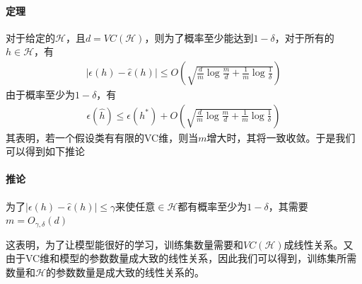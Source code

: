 \paragraph{定理}对于给定的$\mathcal{H}$，且$d=VC(\mathcal{H})$，则为了概率至少能达到$1-\delta$，对于所有的$h\in\mathcal{H}$，有
\begin{eqnarray}
|\epsilon(h)-\hat{\epsilon}(h)|\leq O\left( \sqrt{\frac{d}{m}\log\frac{m}{d}+\frac{1}{m}\log\frac{1}{\delta}}   \right)
\end{eqnarray}
由于概率至少为$1-\delta$，有
\begin{eqnarray}
\epsilon(\hat{h})\leq \epsilon(h^*)+O\left( \sqrt{\frac{d}{m}\log\frac{m}{d}+\frac{1}{m}\log\frac{1}{\delta}}   \right)
\end{eqnarray}
其表明，若一个假设类有有限的VC维，则当$m$增大时，其将一致收敛。于是我们可以得到如下推论

\paragraph{推论}为了$|\epsilon(h)-\hat{\epsilon}(h)|\leq \gamma$来使任意$\in\mathcal{H}$都有概率至少为$1-\delta$，其需要$m=O_{\gamma,\delta}(d)$

这表明，为了让模型能很好的学习，训练集数量需要和$VC(\mathcal{H})$成线性关系。又由于VC维和模型的参数数量成大致的线性关系，因此我们可以得到，训练集所需数量和$\mathcal{H}$的参数数量是成大致的线性关系的。















